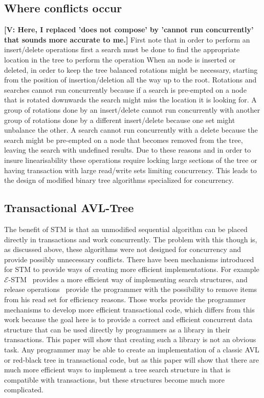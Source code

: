 \documentclass[10pt]{sigplanconf}
\newcommand{\vincent}[1]{{\bf [V: #1]}}
\begin{document}
\subsection*{Where conflicts occur}
\vincent{Here, I replaced 'does not compose' by 'cannot run concurrently' that sounds more accurate to me.}
First note that in order to perform an insert/delete operations first a search must be done to find the appropriate location in the tree to perform the operation
When an node is inserted or deleted, in order to keep the tree balanced rotations might be necessary, starting from the position of insertion/deletion all the way up to the root.
Rotations and searches cannot run concurrently because if a search is pre-empted on a node that is rotated downwards the search might miss the location it is looking for.
A group of rotations done by an insert/delete cannot run concurrently with another group of rotations done by a different insert/delete because one set might unbalance the other.
A search cannot run concurrently with a delete because the search might be pre-empted on a node that becomes removed from the tree, leaving the search with undefined results.
Due to these reasons and in order to insure linearisability these operations require locking large sections of the tree or having transaction with large read/write sets limiting concurrency.
This leads to the design of modified binary tree algorithms specialized for concurrency.

\subsection*{Transactional AVL-Tree}

The benefit of STM is that an unmodified sequential algorithm can be placed directly in transactions and work concurrently.
The problem with this though is, as discussed above, these algorithms were not designed for concurrency and provide possibly unnecessary conflicts.
There have been mechanisms introduced for STM to provide ways of creating more efficient implementations.
For example ${\mathcal E}$-STM~\cite{FGG09} provides a more efficient 
way of implementing search structures, and release operations~\cite{HLMS03} 
provide the programmer with the possibility to remove items from his read set 
for efficiency reasons.
Those works provide the programmer mechanisms to develop more efficient transactional code, which differs from this work because the goal here is to provide a correct and efficient concurrent data structure that can be used directly by programmers as a library in their transactions.
This paper will show that creating such a library is not an obvious task.
Any programmer may be able to create an implementation of a classic AVL or red-black tree in transactional code, but as this paper will show
that there are much more efficient ways to implement a tree search structure in that is compatible with transactions, but these structures become much more complicated.
\end{document}
